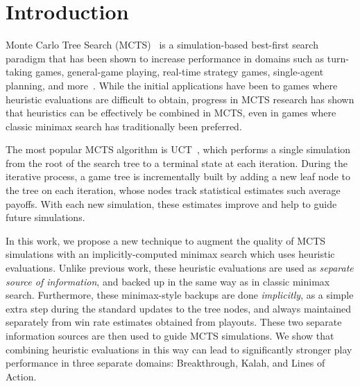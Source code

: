 \documentclass[conference]{IEEEtran}
\begin{document}
\section{Introduction}

Monte Carlo Tree Search (MCTS)~\cite{Coulom06Efficient,Kocsis06Bandit} is a simulation-based best-first
search paradigm that has been shown to increase performance in domains such as turn-taking games, 
general-game playing, real-time strategy games, single-agent planning, and more~\cite{mctssurvey}. 
While the initial applications have been to games where heuristic evaluations are difficult to obtain, 
progress in MCTS research has shown that heuristics can be effectively be combined in MCTS, even in games 
where classic minimax search has traditionally been preferred. 

The most popular MCTS algorithm is UCT~\cite{Kocsis06Bandit}, 
which performs a single simulation from the root of the search tree to a terminal state at each iteration. 
During the iterative process, a game tree is incrementally built by adding a 
new leaf node to the tree on each iteration, whose nodes track statistical estimates such average payoffs. 
With each new simulation, these estimates improve and help to guide future simulations. 


In this work, we propose a new technique to augment the quality of MCTS simulations with  
an implicitly-computed minimax search which uses heuristic evaluations. 
Unlike previous work, these heuristic evaluations are used as {\it separate source of information}, 
and backed up in the same way as in classic minimax search. Furthermore, these minimax-style 
backups are done {\it implicitly},
as a simple extra step during the standard updates to the tree nodes, and always maintained 
separately from win rate estimates obtained from playouts. These two separate information 
sources are then used to guide MCTS simulations. 
We show that combining heuristic evaluations in this way can lead to significantly stronger play performance in three 
separate domains: Breakthrough, Kalah, and Lines of Action. 
\end{document}
